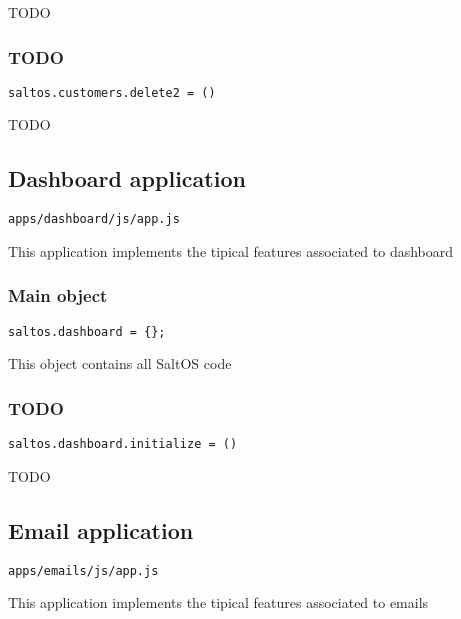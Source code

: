 \documentclass[a4paper]{article}
\begin{document}
TODO

\hypertarget{toc12}{}
\subsubsection{TODO}

\begin{lstlisting}
saltos.customers.delete2 = ()
\end{lstlisting}

TODO

\hypertarget{toc13}{}
\subsection{Dashboard application}

\begin{lstlisting}
apps/dashboard/js/app.js
\end{lstlisting}

This application implements the tipical features associated to dashboard

\hypertarget{toc14}{}
\subsubsection{Main object}

\begin{lstlisting}
saltos.dashboard = {};
\end{lstlisting}

This object contains all SaltOS code

\hypertarget{toc15}{}
\subsubsection{TODO}

\begin{lstlisting}
saltos.dashboard.initialize = ()
\end{lstlisting}

TODO

\hypertarget{toc16}{}
\subsection{Email application}

\begin{lstlisting}
apps/emails/js/app.js
\end{lstlisting}

This application implements the tipical features associated to emails
\end{document}
